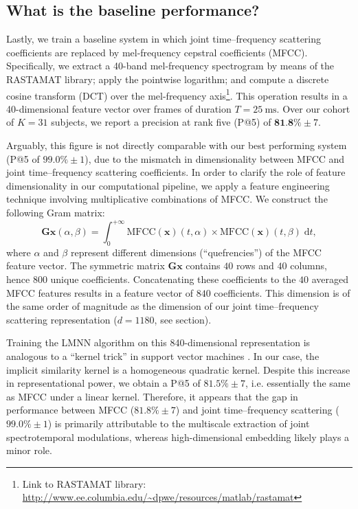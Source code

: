 \documentclass{bmcart}
\newcommand{\lnameref}[1]{%
\bgroup
\let\nmu\MakeLowercase
\nameref{#1}\egroup}
\newcommand{\nmu}{}
\begin{document}
\subsection*{What is the baseline performance?}
Lastly, we train a baseline system in which joint time--frequency scattering coefficients are replaced by mel-frequency cepstral coefficients (MFCC).
Specifically, we extract a 40-band mel-frequency spectrogram by means of the RASTAMAT library; apply the pointwise logarithm; and compute a discrete cosine transform (DCT) over the mel-frequency axis\footnote{Link to RASTAMAT library: \url{http://www.ee.columbia.edu/~dpwe/resources/matlab/rastamat}}.
This operation results in a 40-dimensional feature vector over frames of duration $T=\SI{25}{\milli\second}$.
Over our cohort of $K=31$ subjects, we report a precision at rank five (P@5) of $\textbf{81.8\%} \pm 7$.

Arguably, this figure is not directly comparable with our best performing system (P@5 of $99.0\%\pm 1$), due to the mismatch in dimensionality between MFCC and joint time--frequency scattering coefficients.
In order to clarify the role of feature dimensionality in our computational pipeline, we apply a feature engineering technique involving multiplicative combinations of MFCC.
We construct the following Gram matrix:
\begin{equation}
\mathbf{G} \boldsymbol{x}(\alpha, \beta) =
\int_0^{+\infty}
\mathrm{MFCC}(\boldsymbol{x})(t, \alpha)
\times
\mathrm{MFCC}(\boldsymbol{x})(t, \beta)
\;\mathrm{d}t,
\end{equation}
where $\alpha$ and $\beta$ represent different dimensions (``quefrencies'') of the MFCC feature vector.
The symmetric matrix $\mathbf{G}\boldsymbol{x}$ contains $40$ rows and $40$ columns, hence $800$ unique coefficients.
Concatenating these coefficients to the $40$ averaged MFCC features results in a feature vector of $840$ coefficients.
This dimension is of the same order of magnitude as the dimension of our joint time--frequency scattering representation ($d=1180$, see \lnameref{sec:methods} section).

Training the LMNN algorithm on this 840-dimensional representation is analogous to a ``kernel trick'' in support vector machines \cite{chang2010jmlr}.
In our case, the implicit similarity kernel is a homogeneous quadratic kernel.
Despite this increase in representational power, we obtain a P@5 of $81.5\% \pm 7$, i.e. essentially the same as MFCC under a linear kernel.
Therefore, it appears that the gap in performance between MFCC ($81.8\%\pm 7$) and joint time--frequency scattering ($99.0\% \pm 1$) is primarily attributable to the multiscale extraction of joint spectrotemporal modulations, whereas high-dimensional embedding likely plays a minor role.
\end{document}
